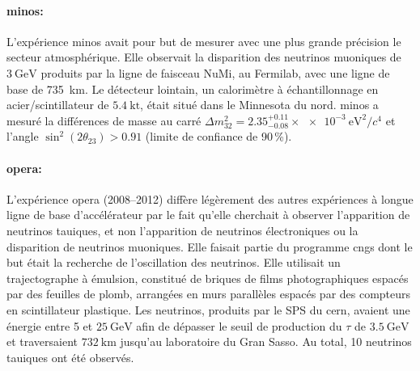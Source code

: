         \paragraph{\gls{minos}\cite{Collaboration2014}:} L'expérience \gls{minos} avait pour but de mesurer avec une plus grande précision le secteur atmosphérique. Elle observait la disparition des neutrinos muoniques de $\SI{3}{\giga\electronvolt}$ produits par la ligne de faisceau NuMi, au Fermilab, avec une ligne de base de \SI{735}{\kilo\meter}. Le détecteur lointain, un calorimètre à échantillonnage en acier/scintillateur de $\SI{5.4}{\kilo\tonne}$, était situé dans le Minnesota du nord. \gls{minos} a mesuré la différences de masse au carré $\Delta m_{32}^2 = 2.35^{+0.11}_{-0.08}\times\SI{e-3}{\electronvolt\squared\per c^4}$ et l'angle $\sin^2(2\theta_{23}) > 0.91$ (limite de confiance de 90\,\%). 

        \paragraph{\gls{opera}\cite{Agafonova2018}:} L'expérience \gls{opera} (2008--2012) diffère légèrement des autres expériences à longue ligne de base d'accélérateur par le fait qu'elle cherchait à observer l'apparition de neutrinos tauiques, et non l'apparition de neutrinos électroniques ou la disparition de neutrinos muoniques. Elle faisait partie du programme \gls{cngs} dont le but était la recherche de l'oscillation des neutrinos. Elle utilisait un trajectographe à émulsion, constitué de  briques de films photographiques espacés par des feuilles de plomb, arrangées en murs parallèles espacés par des compteurs en scintillateur plastique. Les neutrinos, produits par le SPS du \gls{cern}, avaient une énergie entre 5 et $\SI{25}{\giga\electronvolt}$ afin de dépasser le seuil de production du $\tau$ de $\SI{3.5}{\giga\electronvolt}$ et traversaient $\SI{732}{\kilo\meter}$ jusqu'au laboratoire du Gran Sasso. Au total, 10 neutrinos tauiques ont été observés.
        
